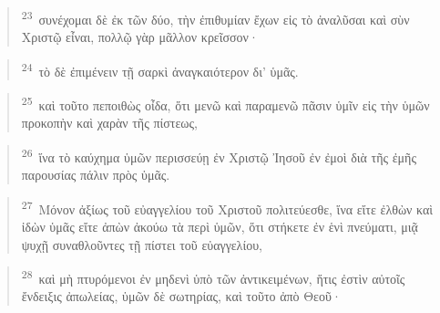 \documentclass{article}
\newcommand{\currentverse}{1} %
\newcommand{\setcurrentverse}[1]{\renewcommand{\currentverse}{#1}}
\begin{document}
\begin{verse}

\setcurrentverse{23}

\setcounter{footnote}{0}

\textsuperscript{23}~συνέχομαι δὲ ἐκ τῶν δύο, τὴν ἐπιθυμίαν ἔχων εἰς τὸ ἀναλῦσαι καὶ σὺν Χριστῷ εἶναι, πολλῷ γὰρ μᾶλλον κρεῖσσον·

\end{verse}

\begin{verse}

\setcurrentverse{24}

\setcounter{footnote}{0}

\textsuperscript{24}~τὸ δὲ ἐπιμένειν τῇ σαρκὶ ἀναγκαιότερον δι’ ὑμᾶς.

\end{verse}

\begin{verse}

\setcurrentverse{25}

\setcounter{footnote}{0}

\textsuperscript{25}~καὶ τοῦτο πεποιθὼς οἶδα, ὅτι μενῶ καὶ παραμενῶ πᾶσιν ὑμῖν εἰς τὴν ὑμῶν προκοπὴν καὶ χαρὰν τῆς πίστεως,

\end{verse}

\begin{verse}

\setcurrentverse{26}

\setcounter{footnote}{0}

\textsuperscript{26}~ἵνα τὸ καύχημα ὑμῶν περισσεύῃ ἐν Χριστῷ Ἰησοῦ ἐν ἐμοὶ διὰ τῆς ἐμῆς παρουσίας πάλιν πρὸς ὑμᾶς.

\end{verse}

\begin{verse}

\setcurrentverse{27}

\setcounter{footnote}{0}

\textsuperscript{27}~Μόνον ἀξίως τοῦ εὐαγγελίου τοῦ Χριστοῦ πολιτεύεσθε, ἵνα εἴτε ἐλθὼν καὶ ἰδὼν ὑμᾶς εἴτε ἀπὼν ἀκούω τὰ περὶ ὑμῶν, ὅτι στήκετε ἐν ἑνὶ πνεύματι, μιᾷ ψυχῇ συναθλοῦντες τῇ πίστει τοῦ εὐαγγελίου,

\end{verse}

\begin{verse}

\setcurrentverse{28}

\setcounter{footnote}{0}

\textsuperscript{28}~καὶ μὴ πτυρόμενοι ἐν μηδενὶ ὑπὸ τῶν ἀντικειμένων, ἥτις ἐστὶν αὐτοῖς ἔνδειξις ἀπωλείας, ὑμῶν δὲ σωτηρίας, καὶ τοῦτο ἀπὸ Θεοῦ·

\end{verse}
\end{document}
